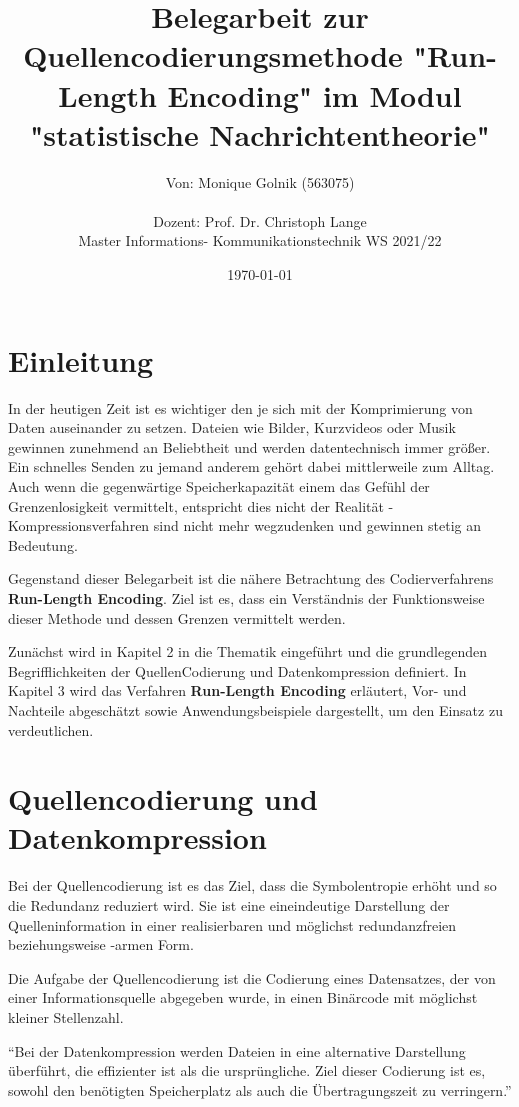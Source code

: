 \documentclass[11pt,a4paper,ngerman]{report}
\date{\today}
\title{Belegarbeit zur Quellencodierungsmethode \textbf{"Run-Length Encoding"} im Modul "statistische Nachrichtentheorie"}
\author{Von: Monique Golnik (563075) \\ \\Dozent: Prof. Dr. Christoph Lange \\Master Informations- Kommunikationstechnik WS 2021/22}
\begin{document}
	\maketitle
	\tableofcontents

	\chapter{Einleitung}
	In der heutigen Zeit ist es wichtiger den je sich mit der Komprimierung von Daten auseinander zu setzen. Dateien wie Bilder, Kurzvideos  oder Musik gewinnen zunehmend an Beliebtheit und werden datentechnisch immer größer. Ein schnelles Senden zu jemand anderem gehört dabei mittlerweile zum Alltag.  Auch wenn die gegenwärtige Speicherkapazität einem das Gefühl der Grenzenlosigkeit vermittelt, entspricht dies nicht der Realität - Kompressionsverfahren sind nicht mehr wegzudenken und gewinnen stetig an Bedeutung.  
	
	Gegenstand dieser Belegarbeit ist die nähere Betrachtung des Codierverfahrens \textbf{Run-Length Encoding}.
	Ziel ist es, dass ein Verständnis der Funktionsweise dieser Methode und dessen Grenzen vermittelt werden.
    
	Zunächst wird in Kapitel 2  in die Thematik  eingeführt und die grundlegenden Begrifflichkeiten der QuellenCodierung und Datenkompression definiert. In Kapitel 3 wird das Verfahren \textbf{Run-Length Encoding} erläutert, Vor- und Nachteile abgeschätzt sowie Anwendungsbeispiele dargestellt, um den Einsatz zu verdeutlichen.



	\chapter{Quellencodierung und Datenkompression}
	
		Bei der Quellencodierung ist es das Ziel, dass die Symbolentropie erhöht und so die Redundanz reduziert wird. Sie ist eine eineindeutige Darstellung der Quelleninformation in einer realisierbaren und möglichst redundanzfreien beziehungsweise -armen Form.
		
		Die Aufgabe der Quellencodierung ist die Codierung eines Datensatzes, der von einer Informationsquelle abgegeben wurde, in einen Binärcode mit möglichst kleiner Stellenzahl. \cite[Seite 47 ff.]{Lange2021}
	     
	    \enquote{Bei der Datenkompression werden Dateien in eine alternative Darstellung überführt, die effizienter ist als die ursprüngliche. Ziel dieser Codierung ist es, sowohl den benötigten Speicherplatz als auch die Übertragungszeit zu verringern.} \cite{IONOS} 
	
\end{document}
